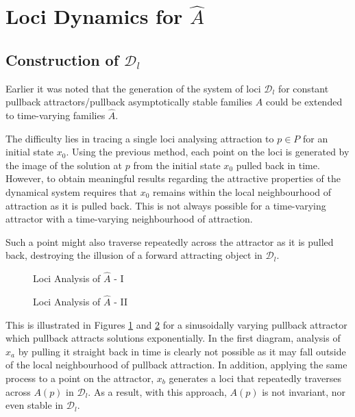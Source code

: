 \section{Loci Dynamics for $\hat{A}$}\label{seclocidynhatA}

\subsection{Construction of $\mathcal{D}_l$}

Earlier it was noted that the generation of the system of loci
$\mathcal{D}_l$ for constant pullback attractors/pullback asymptotically stable
families $A$ could be extended to time-varying families $\hat{A}$.

The difficulty lies in tracing a single loci analysing attraction to $p \in P$ for an initial state $x_0$. Using the previous method, each point on the loci is generated by
the image of the solution at $p$ from the initial state $x_0$ pulled back in
time. However, to obtain meaningful results regarding the attractive properties
of the dynamical system requires that $x_0$ remains within the local
neighbourhood of attraction as it is pulled back. This is not always
possible for a time-varying attractor with a time-varying neighbourhood of
attraction.

Such a point might also traverse repeatedly across the attractor as it is
pulled back, destroying the illusion of a forward attracting object in
$\mathcal{D}_l$.

\begin{figure}[htb]
\begin{center}
 \caption{Loci Analysis of $\hat{A}$ - I}
\protect\label{loci6}
\end{center}
\end{figure}

\begin{figure}[htb]
\begin{center}
 \caption{Loci Analysis of $\hat{A}$ - II}
\protect\label{loci7}
\end{center}
\end{figure}

This is illustrated in Figures \ref{loci6} and \ref{loci7} for a sinusoidally
varying pullback attractor which pullback attracts solutions exponentially.
In the first diagram, analysis of $x_a$ by pulling it straight back in time is
clearly not possible as it may fall outside of the local neighbourhood of
pullback attraction. In addition, applying the same process to a point on the
attractor, $x_b$ generates a loci that repeatedly traverses across $A(p)$ in
$\mathcal{D}_l$. As a result, with this approach, $A(p)$ is not invariant, nor
even stable in $\mathcal{D}_l$.

